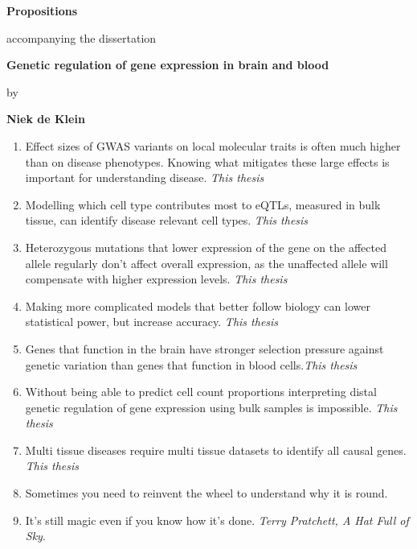 \documentclass[a5]{article}
\begin{document}
	\begin{center}
		{\large \textbf{Propositions}}
		
		\bigskip
		
		accompanying the dissertation
		
		\bigskip
		
		{\bfseries Genetic regulation of gene expression in brain and blood}
		
		\medskip
		
		by
		
		\medskip
		
		{ \textbf{Niek de Klein}}
	\end{center}
	
	\medskip
	
	\begin{enumerate}
		\item Effect sizes of GWAS variants on local molecular traits is often much higher than on disease phenotypes. Knowing what mitigates these large effects is important for understanding disease. \emph{This thesis}
		\item Modelling which cell type contributes most to eQTLs, measured in bulk tissue, can identify disease relevant cell types. \emph{This thesis}
		\item Heterozygous mutations that lower expression of the gene on the affected allele regularly don’t affect overall expression, as the unaffected allele will compensate with higher expression levels. \emph{This thesis}
		\item Making more complicated models that better follow biology can lower statistical power, but increase accuracy. \emph{This thesis}
		\item Genes that function in the brain have stronger selection pressure against genetic variation than genes that function in blood cells.\emph{This thesis}
		\item Without being able to predict cell count proportions interpreting distal genetic regulation of gene expression using bulk samples is impossible. \emph{This thesis}
		\item Multi tissue diseases require multi tissue datasets to identify all causal genes. \emph{This thesis}
		\item Sometimes you need to reinvent the wheel to understand why it is round. 
		\item It’s still magic even if you know how it’s done. \emph{Terry Pratchett, A Hat Full of Sky}.
		

\end{enumerate}
\end{document}
